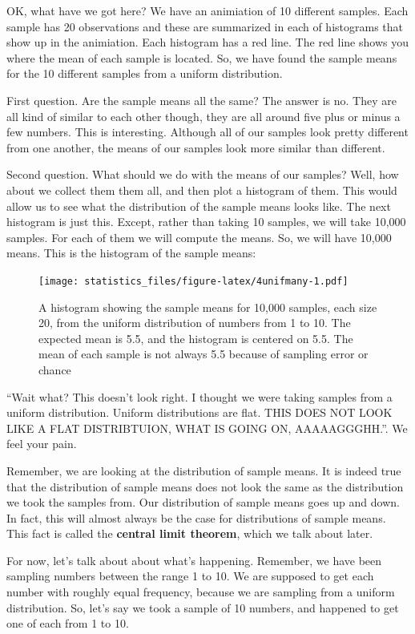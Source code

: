 \documentclass[]{book}
\begin{document}
OK, what have we got here? We have an animiation of 10 different samples. Each sample has 20 observations and these are summarized in each of histograms that show up in the animiation. Each histogram has a red line. The red line shows you where the mean of each sample is located. So, we have found the sample means for the 10 different samples from a uniform distribution.

First question. Are the sample means all the same? The answer is no. They are all kind of similar to each other though, they are all around five plus or minus a few numbers. This is interesting. Although all of our samples look pretty different from one another, the means of our samples look more similar than different.

Second question. What should we do with the means of our samples? Well, how about we collect them them all, and then plot a histogram of them. This would allow us to see what the distribution of the sample means looks like. The next histogram is just this. Except, rather than taking 10 samples, we will take 10,000 samples. For each of them we will compute the means. So, we will have 10,000 means. This is the histogram of the sample means:

\begin{figure}
\centering
\texttt{[image: statistics\_files/figure-latex/4unifmany-1.pdf]}
\caption{\label{fig:4unifmany}A histogram showing the sample means for 10,000 samples, each size 20, from the uniform distribution of numbers from 1 to 10. The expected mean is 5.5, and the histogram is centered on 5.5. The mean of each sample is not always 5.5 because of sampling error or chance}
\end{figure}

``Wait what? This doesn't look right. I thought we were taking samples from a uniform distribution. Uniform distributions are flat. THIS DOES NOT LOOK LIKE A FLAT DISTRIBTUION, WHAT IS GOING ON, AAAAAGGGHH.''. We feel your pain.

Remember, we are looking at the distribution of sample means. It is indeed true that the distribution of sample means does not look the same as the distribution we took the samples from. Our distribution of sample means goes up and down. In fact, this will almost always be the case for distributions of sample means. This fact is called the \textbf{central limit theorem}, which we talk about later.

For now, let's talk about about what's happening. Remember, we have been sampling numbers between the range 1 to 10. We are supposed to get each number with roughly equal frequency, because we are sampling from a uniform distribution. So, let's say we took a sample of 10 numbers, and happened to get one of each from 1 to 10.
\end{document}
